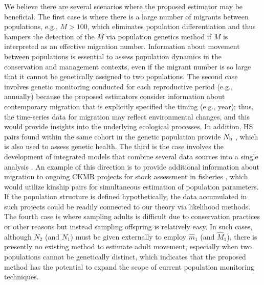 \documentclass[12pt, English]{article}
\begin{document}
\begin{spacing}{1.9}
We believe there are several scenarios where the proposed estimator may be beneficial. The first case is where there is a large number of migrants between populations, e.g., $M>100$, which eliminates population differentiation and thus hampers the detection of the $M$ via population genetics method if $M$ is interpreted as an effective migration number. Information about movement between populations is essential to assess population dynamics in the conservation and management contexts, even if the migrant number is so large that it cannot be genetically assigned to two populations. The second case involves genetic monitoring conducted for each reproductive period (e.g., annually) because the proposed estimators consider information about contemporary migration that is explicitly specified the timing (e.g., year); thus, the time-series data for migration may reflect environmental changes, and this would provide insights into the underlying ecological processes. In addition, HS pairs found within the same cohort in the genetic population provide $N_{\rm b}$ \cite[]{wang2009new,WAPLES_2011}, which is also used to assess genetic health. The third is the case involves the development of integrated models that combine several data sources into a single analysis \cite[]{MAUNDER201361}. An example of this direction is to provide additional information about migration to ongoing CKMR projects for stock assessment in fisheries \cite[e.g.,][]{Bravington_2016,Hillary_2018,https://doi.org/10.1002/ece3.6296,ecolevol2021p,10.1093/icesjms/fsac002}, which would utilize kinship pairs for simultaneous estimation of population parameters. If the population structure is defined hypothetically, the data accumulated in such projects could be readily connected to our theory via likelihood methods. The fourth case is where sampling adults is difficult due to conservation practices or other reasons but instead sampling offspring is relatively easy. In such cases, although $N_2$ (and $N_1$) must be given externally to employ $\hat m_1$ (and $\hat M_1$), there is presently no existing method to estimate adult movement, especially when two populations cannot be genetically distinct, which indicates that the proposed method has the potential to expand the scope of current population monitoring techniques. 


\end{spacing}
\end{document}
